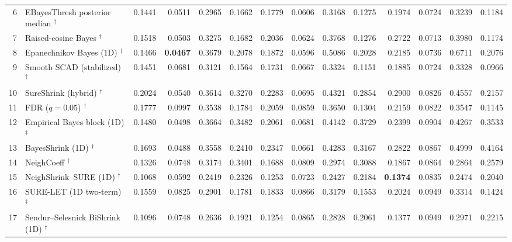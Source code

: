 \begin{landscape}
\begin{center}
\begin{tabular}{@{}r p{7.55cm}*{12}{r}@{}}
6 & EBayesThresh posterior median \citep{JohnstoneSilverman2005EBayes}$^{\dagger}$ & 0.1441 & 0.0511 & 0.2965 & 0.1662 & 0.1779 & 0.0606 & 0.3168 & 0.1275 & 0.1974 & 0.0724 & 0.3239 & 0.1184 \\
7 & Raised-cosine Bayes \citep{ReinaSousa2026RaisedCosine}$^{\dagger}$ & 0.1518 & 0.0503 & 0.3275 & 0.1682 & 0.2036 & 0.0624 & 0.3768 & 0.1276 & 0.2722 & 0.0713 & 0.3980 & 0.1174 \\
8 & Epanechnikov Bayes (1D) \citep{BarriosSousa2025Epanechnikov}$^{\dagger}$ & 0.1466 & \textbf{0.0467} & 0.3679 & 0.2078 & 0.1872 & 0.0596 & 0.5086 & 0.2028 & 0.2185 & 0.0736 & 0.6711 & 0.2076 \\
9 & Smooth SCAD (stabilized) \citep{KulkarniEtAl2026SmoothSCAD}$^{\dagger}$ & 0.1451 & 0.0681 & 0.3121 & 0.1564 & 0.1731 & 0.0667 & 0.3324 & 0.1151 & 0.1885 & 0.0724 & 0.3328 & 0.0966 \\
10 & SureShrink (hybrid) \citep{DonohoJohnstone1995SureShrink}$^{\dagger}$ & 0.2024 & 0.0540 & 0.3614 & 0.3270 & 0.2283 & 0.0695 & 0.4321 & 0.2854 & 0.2900 & 0.0826 & 0.4557 & 0.2157 \\
11 & FDR ($q=0.05$) \citep{AbramovichEtAl2006FDR}$^{\dagger}$ & 0.1777 & 0.0997 & 0.3538 & 0.1784 & 0.2059 & 0.0859 & 0.3650 & 0.1304 & 0.2159 & 0.0822 & 0.3547 & 0.1145 \\
12 & Empirical Bayes block (1D) \citep{AbramovichBesbeasSapatinas2002BlockEB}$^{\ddagger}$ & 0.1480 & 0.0498 & 0.3664 & 0.3482 & 0.2061 & 0.0681 & 0.4142 & 0.3729 & 0.2399 & 0.0904 & 0.4267 & 0.3533 \\
13 & BayesShrink (1D) \citep{ChangYuVetterli2000BayesShrink}$^{\dagger}$ & 0.1693 & 0.0488 & 0.3558 & 0.2410 & 0.2347 & 0.0661 & 0.4283 & 0.3167 & 0.2822 & 0.0867 & 0.4999 & 0.4164 \\
14 & NeighCoeff \citep{CaiSilverman2001Neigh}$^{\dagger}$ & 0.1326 & 0.0748 & 0.3174 & 0.3401 & 0.1688 & 0.0809 & 0.2974 & 0.3088 & 0.1867 & 0.0864 & 0.2864 & 0.2579 \\
15 & NeighShrink--SURE (1D) \citep{ZhouCheng2008NeighShrinkSURE}$^{\dagger}$ & 0.1068 & 0.0592 & 0.2419 & 0.2326 & 0.1253 & 0.0723 & 0.2427 & 0.2184 & \textbf{0.1374} & 0.0835 & 0.2474 & 0.2040 \\
16 & SURE-LET (1D two-term) \citep{BluLuisier2007SURELET}$^{\ddagger}$ & 0.1559 & 0.0825 & 0.2901 & 0.1781 & 0.1833 & 0.0866 & 0.3179 & 0.1553 & 0.2024 & 0.0949 & 0.3314 & 0.1424 \\
17 & Sendur--Selesnick BiShrink (1D) \citep{SendurSelesnick2002BiShrink}$^{\dagger}$ & 0.1096 & 0.0748 & 0.2636 & 0.1921 & 0.1254 & 0.0865 & 0.2828 & 0.2061 & 0.1377 & 0.0949 & 0.2971 & 0.2215 \\

\end{tabular}
\end{center}
\end{landscape}
